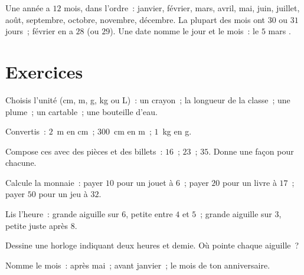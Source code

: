 \begin{example}[Le calendrier]\label{ex:g2:measure:calendar}
Une année a $12$ mois, dans l'ordre~: janvier, février, mars,
avril, mai, juin, juillet, août, septembre, octobre, novembre,
décembre. La plupart des mois ont $30$ ou $31$ jours~; février
en a $28$ (ou $29$). Une date nomme le jour et le mois~:
\guillemotleft{} le $5$ mars \guillemotright{}.
\end{example}

\section{Exercices}

\begin{exercise}[$\star$]\label{exo:g2:measure:1}
Choisis l'unité (cm, m, g, kg ou L)~: un crayon~; la longueur de
la classe~; une plume~; un cartable~; une bouteille d'eau.
\end{exercise}

\begin{exercise}[$\star$]\label{exo:g2:measure:2}
Convertis~: $2$~m en cm~; $300$~cm en m~; $1$~kg en g.
\end{exercise}

\begin{exercise}[$\star$]\label{exo:g2:measure:3}
Compose ces  avec des pièces et des billets~: $16$~; \quad
$23$~; \quad $35$. Donne une façon pour chacune.
\end{exercise}

\begin{exercise}[$\star$]\label{exo:g2:measure:4}
Calcule la monnaie~: payer $10$ pour un jouet à $6$~; payer $20$
pour un livre à $17$~; payer $50$ pour un jeu à $32$.
\end{exercise}

\begin{exercise}[$\star$]\label{exo:g2:measure:5}
Lis l'heure~: grande aiguille sur $6$, petite entre $4$ et $5$~;
grande aiguille sur $3$, petite juste après $8$.
\end{exercise}

\begin{exercise}[$\star$]\label{exo:g2:measure:6}
Dessine une horloge indiquant deux heures et demie. Où pointe
chaque aiguille~?
\end{exercise}

\begin{exercise}[$\star$]\label{exo:g2:measure:7}
Nomme le mois~: après mai~; avant janvier~; le mois de ton
anniversaire.
\end{exercise}

